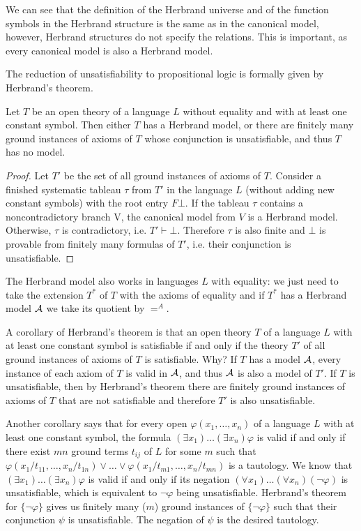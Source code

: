 We can see that the definition of the Herbrand universe and of the function symbols in the Herbrand structure is the same as in the canonical model, however, Herbrand structures do not specify the relations. This is important, as every canonical model is also a Herbrand model.

The reduction of unsatisfiability to propositional logic is formally given by Herbrand's theorem.

\begin{theorem}[Herbrand]
Let $T$ be an open theory of a language $L$ without equality and with at least one constant symbol. Then either $T$ has a Herbrand model, or there are finitely many ground instances of axioms of $T$ whose conjunction is unsatisfiable, and thus $T$ has no model.
\end{theorem}
\begin{proof}
Let $T'$ be the set of all ground instances of axioms of $T$. Consider a finished systematic tableau $\tau$ from $T'$ in the language $L$ (without adding new constant symbols) with the root entry $F \bot$. If the tableau $\tau$ contains a noncontradictory branch V, the canonical model from $V$ is a Herbrand model. Otherwise, $\tau$ is contradictory, i.e. $T' \vdash \bot$. Therefore $\tau$ is also finite and $\bot$ is provable from finitely many formulas of $T'$, i.e. their conjunction is unsatisfiable.
\end{proof}

The Herbrand model also works in languages $L$ with equality: we just need to take the extension $T^*$ of $T$ with the axioms of equality and if $T^*$ has a Herbrand model $\mathcal{A}$ we take its quotient by $=^A$.

A corollary of Herbrand's theorem is that an open theory $T$ of a language $L$ with at least one constant symbol is satisfiable if and only if the theory $T'$ of all ground instances of axioms of $T$ is satisfiable. Why? If $T$ has a model $\mathcal{A}$, every instance of each axiom of $T$ is valid in $\mathcal{A}$, and thus $\mathcal{A}$ is also a model of $T'$. If $T$ is unsatisfiable, then by Herbrand's theorem there are finitely ground instances of axioms of $T$ that are not satisfiable and therefore $T'$ is also unsatisfiable.

Another corollary says that for every open $\varphi(x_1, \dots, x_n)$ of a language $L$ with at least one constant symbol, the formula $(\exists x_1)\dots(\exists x_n)\varphi$ is valid if and only if there exist $mn$ ground terms $t_{ij}$ of $L$ for some $m$ such that $\varphi(x_1/t_{11}, \dots, x_n/t_{1n}) \lor \dots \lor \varphi(x_1/t_{m1}, \dots, x_n/t_{mn})$ is a tautology. We know that $(\exists x_1)\dots(\exists x_n)\varphi$ is valid if and only if its negation $(\forall x_1)\dots(\forall x_n)(\neg\varphi)$ is unsatisfiable, which is equivalent to $\neg \varphi$ being unsatisfiable. Herbrand's theorem for $\{\neg \varphi\}$ gives us finitely many ($m$) ground instances of $\{\neg \varphi\}$ such that their conjunction $\psi$ is unsatisfiable. The negation of $\psi$ is the desired tautology.

